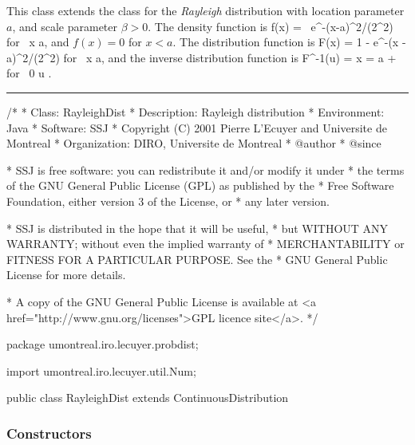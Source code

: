 
This class extends the class  for
the {\em Rayleigh\/} distribution \cite{tEVA00a} with
 location parameter $a$, and scale parameter $\beta > 0$.
The density function is
\eq
  f(x) = \,
                e^{-(x-a)^2/(2\beta^2)}
 \qquad\mbox{for } x \ge a, 
\endeq
and $f(x) = 0$ for $x < a$.
The distribution function is
\eq
   F(x) = 1 - e^{-(x - a)^2/(2\beta^2)}
 \qquad\mbox{for } x \ge a,               
\endeq
and the inverse distribution function is
\eq
     F^{-1}(u) = x = a + \beta{}
               \qquad \mbox{for } 0 \le u .     
\endeq

\bigskip\hrule

\begin{code}
\begin{hide}
/*
 * Class:        RayleighDist
 * Description:  Rayleigh distribution
 * Environment:  Java
 * Software:     SSJ
 * Copyright (C) 2001  Pierre L'Ecuyer and Universite de Montreal
 * Organization: DIRO, Universite de Montreal
 * @author
 * @since

 * SSJ is free software: you can redistribute it and/or modify it under
 * the terms of the GNU General Public License (GPL) as published by the
 * Free Software Foundation, either version 3 of the License, or
 * any later version.

 * SSJ is distributed in the hope that it will be useful,
 * but WITHOUT ANY WARRANTY; without even the implied warranty of
 * MERCHANTABILITY or FITNESS FOR A PARTICULAR PURPOSE.  See the
 * GNU General Public License for more details.

 * A copy of the GNU General Public License is available at
   <a href="http://www.gnu.org/licenses">GPL licence site</a>.
 */
\end{hide}
package umontreal.iro.lecuyer.probdist;
\begin{hide}
import umontreal.iro.lecuyer.util.Num;
\end{hide}
public class RayleighDist extends ContinuousDistribution\begin{hide} {
   private double a;
   private double beta;


\end{hide}
\end{code}
\subsubsection* {Constructors}

